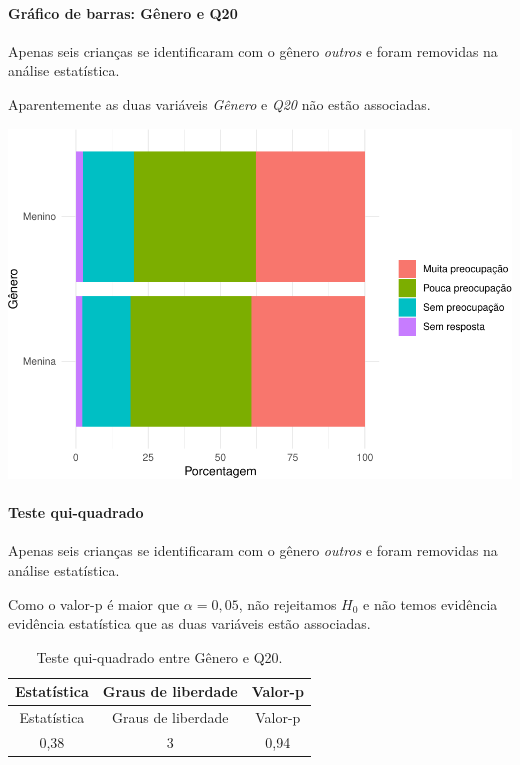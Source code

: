 \documentclass[]{article}
\let\oldparagraph\paragraph
\renewcommand{\paragraph}[1]{\oldparagraph{#1}\mbox{}}
\begin{document}
\hypertarget{gruxe1fico-de-barras-guxeanero-e-q20}{%
\paragraph{Gráfico de barras: Gênero e Q20}\label{gruxe1fico-de-barras-guxeanero-e-q20}}

Apenas seis crianças se identificaram com o gênero \emph{outros} e foram removidas na análise estatística.

Aparentemente as duas variáveis \emph{Gênero} e \emph{Q20} não estão associadas.

\begin{center}\includegraphics[width=0.75\linewidth]{relatorio_files/figure-latex/unnamed-chunk-296-1} \end{center}

\hypertarget{teste-qui-quadrado-33}{%
\paragraph{Teste qui-quadrado}\label{teste-qui-quadrado-33}}

Apenas seis crianças se identificaram com o gênero \emph{outros} e foram removidas na análise estatística.

Como o valor-p é maior que \(\alpha=0,05\), não rejeitamos \(H_0\) e não temos evidência evidência estatística que as duas variáveis estão associadas.

\begin{longtable}[]{@{}ccc@{}}
\caption{\label{tab:unnamed-chunk-297}Teste qui-quadrado entre Gênero e Q20.}\tabularnewline
\toprule
Estatística & Graus de liberdade & Valor-p\tabularnewline
\midrule
\endfirsthead
\toprule
Estatística & Graus de liberdade & Valor-p\tabularnewline
\midrule
\endhead
0,38 & 3 & 0,94\tabularnewline
\bottomrule
\end{longtable}
\end{document}
